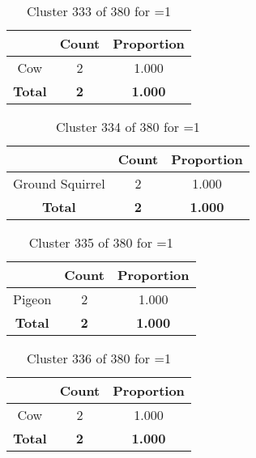 \begin{table}[ht!]
\centering
\begin{tabular}{|c|c|c|}
\hline
\bf \Spec{} &\bf Count &\bf Proportion\\ \hline \hline
Cow & 2 & 1.000\\ \hline
\hline
\bf Total & \bf 2 & \bf 1.000\\ \hline
\end{tabular}
\label{tab:cluster:333:1}
\caption{Cluster 333 of 380 for \minneigh{}=1}
\end{table}

\begin{table}[ht!]
\centering
\begin{tabular}{|c|c|c|}
\hline
\bf \Spec{} &\bf Count &\bf Proportion\\ \hline \hline
Ground Squirrel & 2 & 1.000\\ \hline
\hline
\bf Total & \bf 2 & \bf 1.000\\ \hline
\end{tabular}
\label{tab:cluster:334:1}
\caption{Cluster 334 of 380 for \minneigh{}=1}
\end{table}

\begin{table}[ht!]
\centering
\begin{tabular}{|c|c|c|}
\hline
\bf \Spec{} &\bf Count &\bf Proportion\\ \hline \hline
Pigeon & 2 & 1.000\\ \hline
\hline
\bf Total & \bf 2 & \bf 1.000\\ \hline
\end{tabular}
\label{tab:cluster:335:1}
\caption{Cluster 335 of 380 for \minneigh{}=1}
\end{table}

\begin{table}[ht!]
\centering
\begin{tabular}{|c|c|c|}
\hline
\bf \Spec{} &\bf Count &\bf Proportion\\ \hline \hline
Cow & 2 & 1.000\\ \hline
\hline
\bf Total & \bf 2 & \bf 1.000\\ \hline
\end{tabular}
\label{tab:cluster:336:1}
\caption{Cluster 336 of 380 for \minneigh{}=1}
\end{table}

